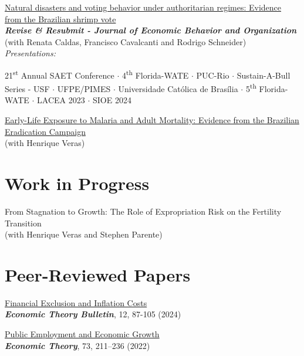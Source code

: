 \documentclass[mm, 10pt]{simple_style}
\begin{document}
\begin{resume}
\href{https://papers.ssrn.com/sol3/papers.cfm?abstract_id=4249006}{Natural disasters and voting behavior under authoritarian regimes: Evidence from the Brazilian shrimp vote} \\
\textbf{\textit{Revise \& Resubmit - Journal of Economic Behavior and Organization}} \\
(with Renata Caldas, Francisco Cavalcanti and Rodrigo Schneider) \\
\textit{Presentations:} 
\begin{minipage}[t]{0.7\textwidth}
 21\textsuperscript{st} Annual SAET Conference 
 $\cdot$ 4\textsuperscript{th} Florida-WATE 
 $\cdot$ PUC-Rio 
 $\cdot$ Sustain-A-Bull Series - USF 
 $\cdot$ UFPE/PIMES 
$\cdot$ Universidade Cat\'olica de Bras\'ilia 
 $\cdot$ 5\textsuperscript{th} Florida-WATE
 $\cdot$ {LACEA 2023} 
 $\cdot$ {SIOE 2024}
\end{minipage}

\href{https://drive.google.com/file/d/1dIZK5thBKYu-IsduU5E65SdG_z4sQW8h/view}{Early-Life Exposure to Malaria and Adult Mortality: Evidence from the Brazilian Eradication Campaign}\\
(with Henrique Veras)

\section{Work in Progress}

From Stagnation to Growth: The Role of Expropriation Risk on the Fertility Transition\\
(with Henrique Veras and Stephen Parente)



\section{Peer-Reviewed Papers}
\href{https://doi.org/10.1007/s40505-024-00265-x}{Financial Exclusion and Inflation Costs}\\
\textbf{\textit{Economic Theory Bulletin}}, 12, 87-105 (2024) 



\href{https://doi.org/10.1007/s00199-020-01333-6}{Public Employment and Economic Growth}\\
\textbf{\textit{Economic Theory}}, 73, 211–236 (2022)  


\end{resume}
\end{document}
